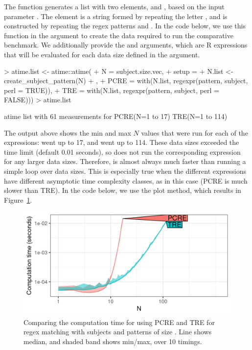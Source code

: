 The  function generates a list with two elements,  and , based on the input parameter . 
The  element is a string formed by repeating the letter , and  is constructed by repeating the regex patterns  and . 
In the code below, we use this function in the  argument to create the data required to run the comparative benchmark. 
We additionally provide the  and  arguments, which are R expressions that will be evaluated for each data size defined in the  argument. 
\begin{Schunk}
\begin{Sinput}
> atime.list <- atime::atime(
+   N = subject.size.vec,
+   setup = {
+     N.list <- create_subject_pattern(N)
+   },
+   PCRE = with(N.list, regexpr(pattern, subject, perl = TRUE)),
+   TRE = with(N.list, regexpr(pattern, subject, perl = FALSE)))
> atime.list
\end{Sinput}
\begin{Soutput}
atime list with 61 measurements for
PCRE(N=1 to 17)
TRE(N=1 to 114) 
\end{Soutput}
\end{Schunk}
The output above shows the min and max $N$ values that were run for each of the expressions:  went up to 17, and  went up to 114.
These data sizes exceeded the time limit (default 0.01 seconds), so  does not run the corresponding expression for any larger data sizes.
Therefore,  is almost always much faster than running a simple loop over data sizes.
This is especially true when the different expressions have different asymptotic time complexity classes, as in this case (PCRE is much slower than TRE). 
In the code below, we use the plot method, which results in Figure~\ref{fig:plot-atime-PCRE-TRE}.
\begin{Schunk}
\end{Schunk}
\begin{figure}[t]
    \centering
    \includegraphics[width=0.9\linewidth]{create_subject_pattern_atime.png}
    \caption{Comparing the computation time for using PCRE and TRE for regex matching with subjects and patterns of size .
    Line shows median, and shaded band shows min/max, over 10 timings.}
    \label{fig:plot-atime-PCRE-TRE}
\end{figure}
